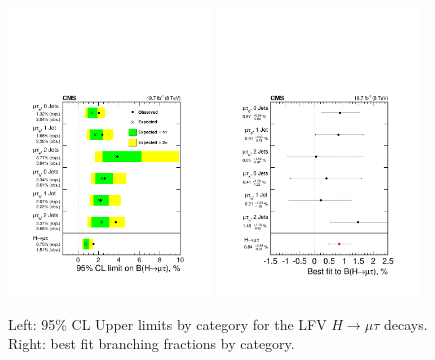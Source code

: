 \documentclass[oneside, letterpaper, oldfontcommands]{memoir}
\begin{document}
{{{\begin{figure}[hbtp]
\includegraphics[width=0.48\textwidth]{plotLimit.pdf}
\includegraphics[width=0.48\textwidth]{BestBr.pdf}
 \caption{Left: 95\% CL Upper limits by category for the LFV $H \rightarrow \mu \tau$  decays. Right: best fit branching fractions by category.}
 \label{fig:limits_summary}\end{figure}
}}}
\end{document}
